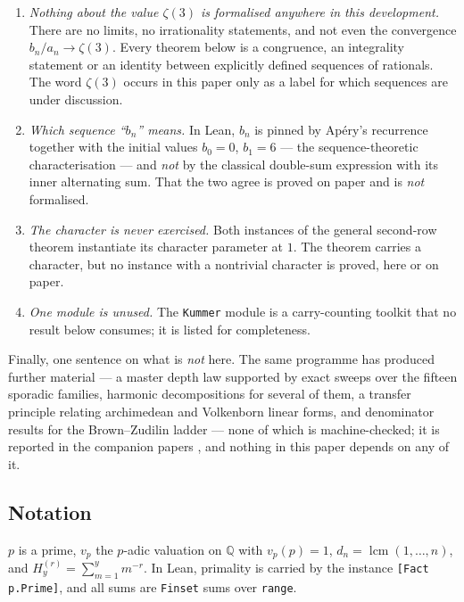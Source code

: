 \documentclass[11pt,reqno]{amsart}
\theoremstyle{plain}
\theoremstyle{definition}
\theoremstyle{remark}
\newcommand{\Q}{\mathbb{Q}}
\newcommand{\vp}{v_p}
\newcommand{\HH}[2]{H^{(#1)}_{#2}}
\newcommand{\lcm}{\operatorname{lcm}}
\newcommand{\Ln}[1]{\texttt{#1}}
\numberwithin{equation}{section}
\begin{document}
\begin{enumerate}[leftmargin=1.9em,label=\textup{(\alph*)}]
\item \emph{Nothing about the value $\zeta(3)$ is formalised anywhere in this development.}
  There are no limits, no irrationality statements, and not even the convergence
  $b_n/a_n\to\zeta(3)$. Every theorem below is a congruence, an integrality statement or an
  identity between explicitly defined sequences of rationals. The word $\zeta(3)$ occurs in
  this paper only as a label for which sequences are under discussion.
\item \emph{Which sequence ``$b_n$'' means.} In Lean, $b_n$ is pinned by Ap\'ery's
  recurrence together with the initial values $b_0=0$, $b_1=6$ --- the sequence-theoretic
  characterisation --- and \emph{not} by the classical double-sum expression with its inner
  alternating sum. That the two agree is proved on paper \cite{PaperLucas} and is
  \emph{not} formalised.
\item \emph{The character is never exercised.} Both instances of the general second-row
  theorem instantiate its character parameter at $1$. The theorem carries a character, but no
  instance with a nontrivial character is proved, here or on paper.
\item \emph{One module is unused.} The \Ln{Kummer} module is a carry-counting toolkit that no
  result below consumes; it is listed for completeness.
\end{enumerate}

Finally, one sentence on what is \emph{not} here. The same programme has produced further
material --- a master depth law supported by exact sweeps over the fifteen sporadic families,
harmonic decompositions for several of them, a transfer principle relating archimedean and
Volkenborn linear forms, and denominator results for the Brown--Zudilin ladder --- none of
which is machine-checked; it is reported in the companion papers
\cite{PaperLucas,PaperSharp,PaperMap}, and nothing in this paper depends on any of it.

\subsection*{Notation} $p$ is a prime, $\vp$ the $p$-adic valuation on $\Q$ with $\vp(p)=1$,
$d_n=\lcm(1,\dots,n)$, and $\HH ry=\sum_{m=1}^ym^{-r}$. In Lean, primality is carried by the
instance \Ln{[Fact p.Prime]}, and all sums are \Ln{Finset} sums over \Ln{range}.

\end{document}
